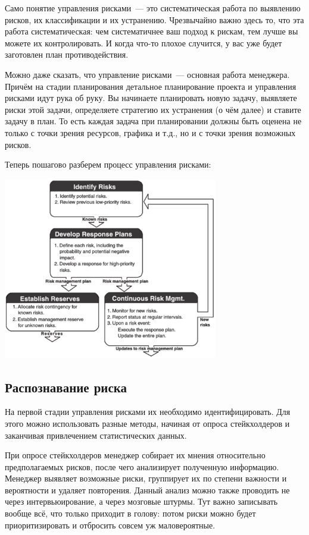 \documentclass{../../text-style}
\begin{document}
Само понятие управления рисками~--- это систематическая работа по выявлению рисков, их классификации и их устранению. Чрезвычайно важно здесь то, что эта работа систематическая: чем систематичнее ваш подход к рискам, тем лучше вы можете их контролировать. И когда что-то плохое случится, у вас уже будет заготовлен план противодействия.

Можно даже сказать, что управление рисками~--- основная работа менеджера. Причём на стадии планирования детальное планирование проекта и управления рисками идут рука об руку. Вы начинаете планировать новую задачу, выявляете риски этой задачи, определяете стратегию их устранения (о чём далее) и ставите задачу в план. То есть каждая задача при планировании должны быть оценена не только с точки зрения ресурсов, графика и т.д., но и с точки зрения возможных рисков.

Теперь пошагово разберем процесс управления рисками:

\begin{center}
    \includegraphics[width=0.7\textwidth]{riskManagementLoop.png}
\end{center}

\subsection{Распознавание риска}

На первой стадии управления рисками их необходимо идентифицировать. Для этого можно использовать разные методы, начиная от опроса стейкхолдеров и заканчивая привлечением статистических данных.

При опросе стейкхолдеров менеджер собирает их мнения относительно предполагаемых рисков, после чего анализирует полученную информацию. Менеджер выявляет возможные риски, группирует их по степени важности и вероятности и удаляет повторения. Данный анализ можно также проводить не через интервьюирование, а через мозговые штурмы. Тут важно записывать вообще всё, что только приходит в голову: потом риски можно будет приоритизировать и отбросить совсем уж маловероятные.
\end{document}
